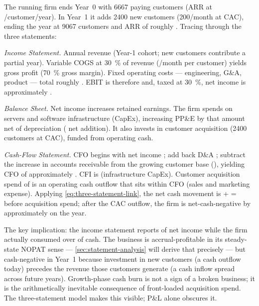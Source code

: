 \begin{example}
The running firm ends Year~0 with \num{6667} paying customers (ARR  at
/customer/year). In Year~1 it adds \num{2400} new customers (\num{200}/month at
 CAC), ending the year at \num{9067} customers and ARR of roughly .
Tracing through the three statements:

\medskip
\textit{Income Statement.} Annual revenue  (Year-1 cohort; new customers
contribute a partial year). Variable COGS at \qty{30}{\percent} of revenue (/month
per customer) yields gross profit  (\qty{70}{\percent} gross margin). Fixed
operating costs --- engineering, G\&A, product --- total roughly . EBIT is
therefore  and, taxed at \qty{30}{\percent}, net income is approximately
.

\medskip
\textit{Balance Sheet.} Net income  increases retained earnings. The firm
spends  on servers and software infrastructure (CapEx), increasing PP\&E by
that amount net of  depreciation ( net addition). It also invests
 in customer acquisition (\num{2400} customers at  CAC), funded
from operating cash.

\medskip
\textit{Cash-Flow Statement.} CFO begins with net income ; add back D\&A
; subtract the increase in accounts receivable from the growing customer base
(), yielding CFO of approximately . CFI is 
(infrastructure CapEx). Customer acquisition spend of  is an operating cash
outflow that sits within CFO (sales and marketing expense). Applying \cref{eq:three-statement-link},
the net cash movement is  +  =  before
acquisition spend; after the  CAC outflow, the firm is net-cash-negative by
approximately  on the year.

\medskip
The key implication: the income statement reports  of net income while the
firm actually consumed over  of cash. The business is accrual-profitable in
its steady-state NOPAT sense --- \cref{sec:statement-analysis} will derive that
 precisely --- but cash-negative in Year~1 because investment in new customers
(a cash outflow today) precedes the revenue those customers generate (a cash inflow spread
across future years). Growth-phase cash burn is not a sign of a broken business; it is the
arithmetically inevitable consequence of front-loaded acquisition spend. The three-statement
model makes this visible; P\&L alone obscures it.
\end{example}

